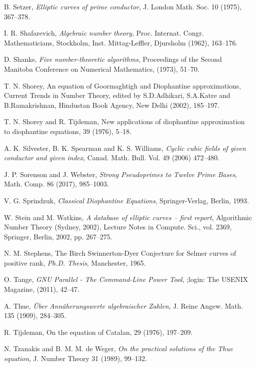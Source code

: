 \begin{thebibliography}{}
B. Setzer,
\emph{Elliptic curves of prime conductor},
J. London Math. Soc. 10 (1975), 367--378.

I. R. Shafarevich,
\emph{Algebraic number theory}, Proc. Internat. Congr. Mathematicians,
Stockholm, Inst. Mittag-Leffler, Djursholm (1962), 163--176.

D. Shanks,
\emph{Five number-theoretic algorithms},
 Proceedings of the Second Manitoba Conference on Numerical Mathematics, (1973), 51--70.

T. N. Shorey,
\newblock An equation of Goormaghtigh and Diophantine approximations,
\newblock Current Trends in Number Theory, edited by S.D.Adhikari, S.A.Katre and B.Ramakrishnan, Hindustan Book Agency, New Delhi (2002), 185--197.

T. N. Shorey and R. Tijdeman,
\newblock New applications of diophantine approximation to diophantine equations,
 39 (1976), 5--18.

A. K. Silvester, B. K. Spearman and K. S. Williams,
\emph{Cyclic cubic fields of given conductor
and given index}, Canad. Math. Bull. Vol. 49 (2006)  472--480.

 J. P. Sorenson and J. Webster, 
  \emph{Strong Pseudoprimes to Twelve 
Prime Bases}, Math. Comp. 86 (2017), 985--1003.

V. G. Sprindzuk,
\emph{Classical Diophantine Equations},
Springer-Verlag, Berlin, 1993.

W. Stein and M. Watkins,
\emph{A database of elliptic curves -- first report},
Algorithmic Number Theory (Sydney, 2002), Lecture Notes in Compute. Sci., vol. 2369, 
Springer, Berlin, 2002, pp. 267--275.
  
N. M. Stephens, 
The Birch Swinnerton-Dyer Conjecture for Selmer
curves of positive rank,
\emph{Ph.D. Thesis}, Manchester, 1965.

O. Tange,
\emph{GNU Parallel - The Command-Line Power Tool},
;login: The USENIX Magazine, (2011), 42--47.

A. Thue,
\emph{\"Uber Ann\"aherungswerte algebraischer Zahlen},
J. Reine Angew. Math. 135 (1909), 284--305.

R. Tijdeman,
\newblock On the equation of Catalan, 
 29 (1976), 197--209.

N. Tzanakis and B. M. M. de Weger,
\emph{On the practical solutions of the Thue equation},
J. Number Theory 31 (1989), 99--132.


\end{thebibliography}
